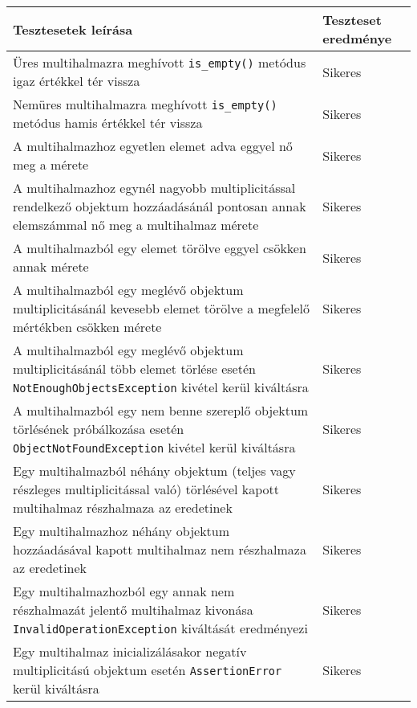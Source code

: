 \begin{table}[H]
	\centering
	\begin{tabular}{ | m{} | m{} | }
		\hline
		\textbf{Tesztesetek leírása} & \textbf{Teszteset eredménye} \\
		\hline \hline
		Üres multihalmazra meghívott \verb|is_empty()| metódus igaz értékkel tér vissza & Sikeres \\
		\hline
	Nemüres multihalmazra meghívott \verb|is_empty()| metódus hamis értékkel tér vissza & Sikeres \\
		\hline
		
		A multihalmazhoz egyetlen elemet adva eggyel nő meg a mérete &  Sikeres \\
		\hline
		
		A multihalmazhoz egynél nagyobb multiplicitással rendelkező objektum hozzáadásánál pontosan annak elemszámmal nő meg a multihalmaz mérete &  Sikeres \\
		\hline
		A multihalmazból egy elemet törölve eggyel csökken annak mérete &  Sikeres \\
		\hline
		
		A multihalmazból egy meglévő objektum multiplicitásánál kevesebb elemet törölve a megfelelő mértékben csökken mérete &  Sikeres \\
		\hline
		A multihalmazból egy meglévő objektum multiplicitásánál több elemet törlése esetén \verb|NotEnoughObjectsException| kivétel kerül kiváltásra &  Sikeres \\
		\hline
				A multihalmazból egy nem benne szereplő objektum törlésének próbálkozása esetén \verb|ObjectNotFoundException| kivétel kerül kiváltásra &  Sikeres \\
		\hline
		
		Egy multihalmazból néhány objektum (teljes vagy részleges multiplicitással való) törlésével  kapott multihalmaz részhalmaza az eredetinek &  Sikeres \\
		\hline
		
		Egy multihalmazhoz néhány objektum hozzáadásával kapott multihalmaz nem részhalmaza az eredetinek &  Sikeres \\
		\hline
		
				Egy multihalmazhozból egy annak nem részhalmazát jelentő multihalmaz kivonása \verb|InvalidOperationException| kiváltását eredményezi &  Sikeres \\
		\hline
		
		
		Egy multihalmaz inicializálásakor negatív multiplicitású objektum esetén \verb|AssertionError| kerül kiváltásra &  Sikeres \\
		\hline
		

\end{tabular}
\end{table}

